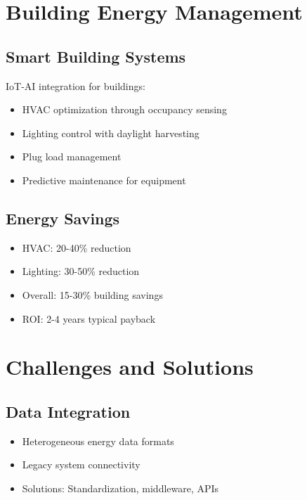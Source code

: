 \documentclass[12pt,a4paper]{article}
\begin{document}
\section{Building Energy Management}

\subsection{Smart Building Systems}

IoT-AI integration for buildings:
\begin{itemize}
    \item HVAC optimization through occupancy sensing
    \item Lighting control with daylight harvesting
    \item Plug load management
    \item Predictive maintenance for equipment
\end{itemize}

\subsection{Energy Savings}

\begin{tcolorbox}[colback=greenpower!10, colframe=greenpower, title=Building Energy Results]
\begin{itemize}
    \item HVAC: 20-40\% reduction
    \item Lighting: 30-50\% reduction
    \item Overall: 15-30\% building savings
    \item ROI: 2-4 years typical payback
\end{itemize}
\end{tcolorbox}

\section{Challenges and Solutions}

\subsection{Data Integration}

\begin{itemize}
    \item Heterogeneous energy data formats
    \item Legacy system connectivity
    \item Solutions: Standardization, middleware, APIs
\end{itemize}
\end{document}
